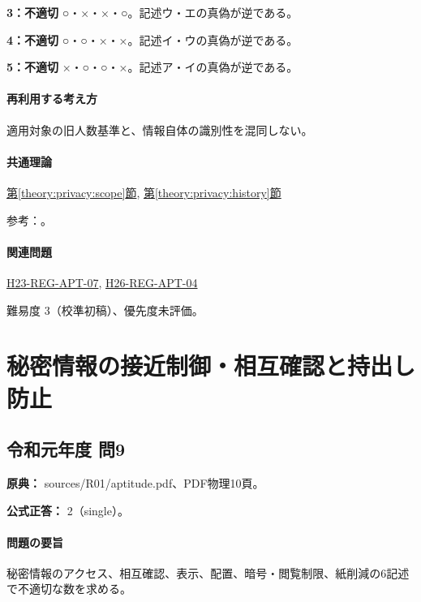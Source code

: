 \noindent\textbf{3：不適切} ○・×・×・○。記述ウ・エの真偽が逆である。\par

\noindent\textbf{4：不適切} ○・○・×・×。記述イ・ウの真偽が逆である。\par

\noindent\textbf{5：不適切} ×・○・○・×。記述ア・イの真偽が逆である。\par

\paragraph{再利用する考え方} 適用対象の旧人数基準と、情報自体の識別性を混同しない。

\paragraph{共通理論} \hyperref[theory:privacy:scope]{第\ref*{theory:privacy:scope}節}, \hyperref[theory:privacy:history]{第\ref*{theory:privacy:history}節}

\par 参考：\cite{privacy_general,privacy_small2017}。

\paragraph{関連問題} \hyperref[q:h23-reg-apt-07]{H23-REG-APT-07}, \hyperref[q:h26-reg-apt-04]{H26-REG-APT-04}

\par 難易度 3（校準初稿）、優先度未評価。

\section{秘密情報の接近制御・相互確認と持出し防止}

\subsection{令和元年度 問9}
\label{q:r01-reg-apt-09}

\noindent\textbf{原典：} sources/R01/aptitude.pdf、PDF物理10頁。

\textbf{公式正答：} 2（single）。

\paragraph{問題の要旨} 秘密情報のアクセス、相互確認、表示、配置、暗号・閲覧制限、紙削減の6記述で不適切な数を求める。

